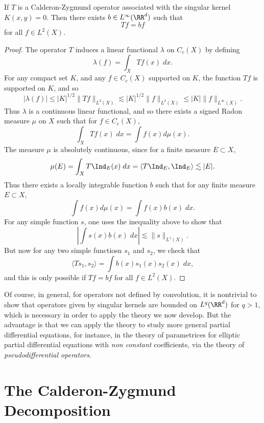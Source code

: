 \begin{theorem}
    If $T$ is a Calderon-Zygmund operator associated with the singular kernel $K(x,y) = 0$. Then there exists $b \in L^\infty(\RR^d)$ such that
    \[ Tf = bf \]
    for all $f \in L^2(X)$.
\end{theorem}
\begin{proof}
    The operator $T$ induces a linear functional $\lambda$ on $C_c(X)$ by defining
    \[ \lambda(f) = \int_X Tf(x)\; dx. \]
    For any compact set $K$, and any $f \in C_c(X)$ supported on $K$, the function $Tf$ is supported on $K$, and so
    \[ |\lambda(f)| \leq |K|^{1/2} \| Tf \|_{L^2(X)} \lesssim |K|^{1/2} \| f \|_{L^2(X)} \leq |K| \| f \|_{L^\infty(X)}. \]
    Thus $\lambda$ is a continuous linear functional, and so there exists a signed Radon measure $\mu$ on $X$ such that for $f \in C_c(X)$,
    \[ \int_X Tf(x)\; dx = \int f(x) d\mu(x). \]
    The measure $\mu$ is absolutely continuous, since for a finite measure $E \subset X$,
    \[ \mu(E) = \int_X T \Ind_E(x)\; dx = \langle T \Ind_E, \Ind_E \rangle \lesssim |E|. \]
    Thus there exists a locally integrable function $b$ such that for any finite measure $E \subset X$,
    \[ \int f(x) d\mu(x) = \int f(x) b(x)\; dx. \]
    For any simple function $s$, one uses the inequality above to show that
    \[ \left| \int s(x) b(x)\; dx \right| \lesssim \| s \|_{L^1(X)}. \]
    But now for any two simple functiosn $s_1$ and $s_2$, we check that
    \[ \langle T s_1, s_2 \rangle = \int b(x) s_1(x) s_2(x)\; dx, \]
    and this is only possible if $Tf = bf$ for all $f \in L^2(X)$.
\end{proof}

Of course, in general, for operators not defined by convolution, it is nontrivial to show that operators given by singular kernels are bounded on $L^q(\RR^d)$ for $q > 1$, which is necessary in order to apply the theory we now develop. But the advantage is that we can apply the theory to study more general partial differential equations, for instance, in the theory of parametrices for elliptic partial differential equations with \emph{non constant} coefficients, via the theory of \emph{pseudodifferential operators}.

\section{The Calderon-Zygmund Decomposition}

